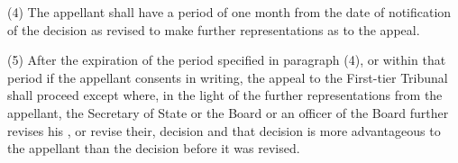 \documentclass[12pt,a4paper]{article}
\begin{document}
(4) The appellant shall have a period of one month from the date of notification of the decision as 
revised to make further representations as to the appeal.

(5) After the expiration of the period specified in paragraph (4), or within that period if the appellant consents in writing, the appeal to the 
First-tier Tribunal  %
shall proceed except where, in the light of the further representations from the appellant, the Secretary of State
or the Board or an officer of the Board  %
further revises his%
, or revise their,  %
decision and that decision is more advantageous to the appellant than the decision before it was 
revised.
\end{document}
